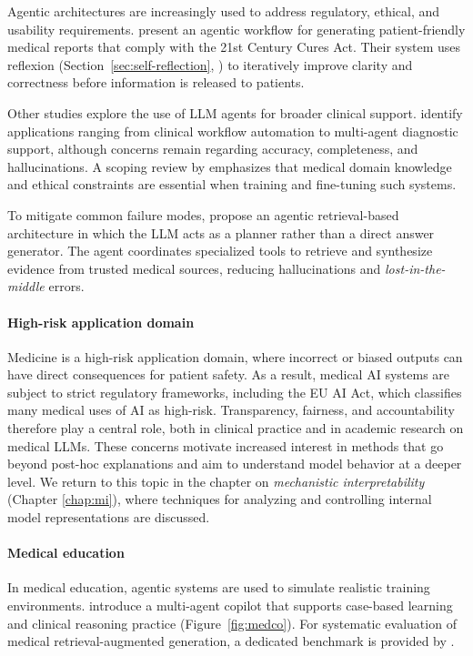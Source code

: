 Agentic architectures are increasingly used to address regulatory, ethical, and usability
requirements. \citet{sudarshan2024agentic} present an agentic workflow for generating
patient-friendly medical reports that comply with the 21st Century Cures Act. Their system
uses reflexion (Section~\ref{sec:self-reflection}, \citep{shinn2024reflexion}) to iteratively improve clarity and correctness before information is released to patients.

Other studies explore the use of LLM agents for broader clinical support. \citet{qiu2024llm} identify
applications ranging from clinical workflow automation to multi-agent diagnostic support, although  concerns remain regarding accuracy, completeness, and hallucinations.
A scoping review by \citet{ullah2024challenges} emphasizes that medical domain knowledge and ethical constraints are essential when training and fine-tuning such systems.

To mitigate common failure modes, \citet{das2024improved} propose an agentic retrieval-based architecture in which the LLM acts as a planner rather than a direct answer generator. The agent coordinates specialized tools to retrieve and synthesize evidence from trusted medical
sources, reducing hallucinations and \emph{lost-in-the-middle} errors.

\paragraph{High-risk application domain}
Medicine is a high-risk application domain, where incorrect or biased outputs can have direct consequences for patient safety. As a result, medical AI systems are subject to strict regulatory frameworks, including the EU AI Act, which classifies many medical uses of AI as high-risk. Transparency, fairness, and accountability therefore play a central role, both in clinical practice and in academic research on medical LLMs. 
These concerns motivate increased interest in methods that go beyond post-hoc explanations and aim to understand model behavior at a deeper level. We return to this topic in the chapter on \emph{mechanistic interpretability} (Chapter \ref{chap:mi}), where techniques for analyzing and controlling internal model representations are discussed.

\paragraph{Medical education}
In medical education, agentic systems are used to simulate realistic training environments.
\citet{wei2024medco} introduce a multi-agent copilot that supports case-based learning and clinical reasoning practice (Figure~\ref{fig:medco}). For systematic evaluation of medical retrieval-augmented generation, a dedicated benchmark is provided by
\citet{qiao2024benchmarking}.

